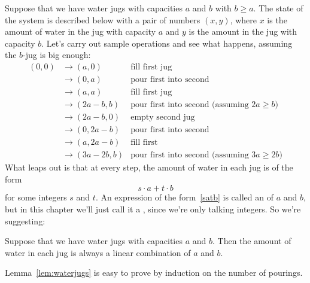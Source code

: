 Suppose that we have water jugs with capacities $a$ and $b$ with
$b \geq a$.  The state of the system is described below with a pair of
numbers $(x, y)$, where $x$ is the amount of water in the jug with
capacity $a$ and $y$ is the amount in the jug with capacity $b$.
Let's carry out sample operations and see what happens, assuming the
$b$-jug is big enough:
%
\begin{align*}
(0,0)
& \rightarrow (a,0) & \text{fill first jug} \\
& \rightarrow (0,a) & \text{pour first into second} \\
& \rightarrow (a, a) & \text{fill first jug} \\
& \rightarrow (2a-b, b) & \text{pour first into second (assuming $2a \geq b$)} \\
& \rightarrow (2a-b, 0) & \text{empty second jug} \\
& \rightarrow (0, 2a-b) & \text{pour first into second} \\
& \rightarrow (a, 2a-b) & \text{fill first} \\
& \rightarrow (3a-2b, b) & \text{pour first into second (assuming $3a \geq 2b$)}
\end{align*}
%
What leaps out is that at every step, the amount of water in each jug is
of the form
%
\begin{equation}\label{satb}
s \cdot a + t \cdot b
\end{equation}
%
for some integers $s$ and $t$.  An expression of the form~\eqref{satb} is
called an  of $a$ and $b$, but in this
chapter we'll just call it a , since we're only
talking integers.  So we're suggesting:
\begin{lemma}
\label{lem:waterjugs}
Suppose that we have water jugs with capacities $a$ and $b$.  Then the
amount of water in each jug is always a linear combination of $a$ and
$b$.
\end{lemma}

Lemma~\ref{lem:waterjugs} is easy to prove by induction on the number of
pourings.

